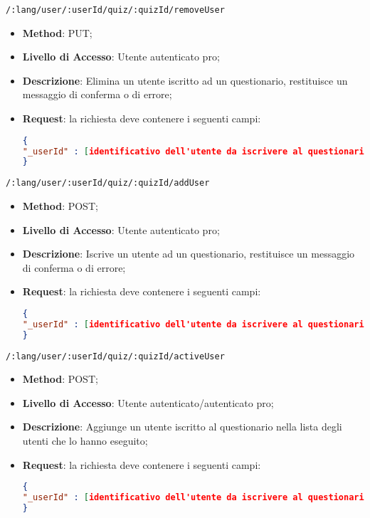 		
		
	\item \texttt{/:lang/user/:userId/quiz/:quizId/removeUser}
	\begin{itemize}
		\item \textbf{Method}: PUT;
		\item \textbf{Livello di Accesso}: Utente autenticato pro;
		\item \textbf{Descrizione}: Elimina un utente iscritto ad un questionario, restituisce un messaggio di conferma o di errore;
		\item \textbf{Request}: la richiesta deve contenere i seguenti campi:
\begin{lstlisting}[language=json,firstnumber=1]
{
"_userId" : [identificativo dell'utente da iscrivere al questionario]
}
\end{lstlisting}
	\end{itemize}
		
		
	\item \texttt{/:lang/user/:userId/quiz/:quizId/addUser}
	\begin{itemize}
		\item \textbf{Method}: POST;
		\item \textbf{Livello di Accesso}: Utente autenticato pro;
		\item \textbf{Descrizione}: Iscrive un utente ad un questionario, restituisce un messaggio di conferma o di errore;
		\item \textbf{Request}: la richiesta deve contenere i seguenti campi:
\begin{lstlisting}[language=json,firstnumber=1]
{
"_userId" : [identificativo dell'utente da iscrivere al questionario]
}
\end{lstlisting}
	\end{itemize}
	
	\item \texttt{/:lang/user/:userId/quiz/:quizId/activeUser}
	\begin{itemize}
		\item \textbf{Method}: POST;
		\item \textbf{Livello di Accesso}: Utente autenticato/autenticato pro;
		\item \textbf{Descrizione}: Aggiunge un utente iscritto al questionario nella lista degli utenti che lo hanno eseguito;
		\item \textbf{Request}: la richiesta deve contenere i seguenti campi:
\begin{lstlisting}[language=json,firstnumber=1]
{
"_userId" : [identificativo dell'utente da iscrivere al questionario]
}
\end{lstlisting}
	\end{itemize}
	
